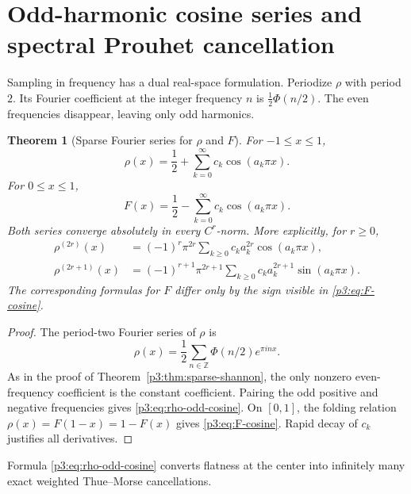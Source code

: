 \documentclass[11pt,oneside]{article}
\newtheorem{theorem}{Theorem}[section]
\theoremstyle{definition}
\begin{document}
\section{Odd-harmonic cosine series and spectral Prouhet cancellation}
\label{p3:sec:cosine-p-series}

Sampling in frequency has a dual real-space formulation.  Periodize \(\rho\) with period
\(2\).  Its Fourier coefficient at the integer frequency \(n\) is
\(\frac12\Phi(n/2)\).  The even frequencies disappear, leaving only odd harmonics.

\begin{theorem}[Sparse Fourier series for \(\rho\) and \(F\)]
\label{p3:thm:sparse-cosine}
For \(-1\le x\le1\),
\begin{equation}
\boxed{
 \rho(x)=\frac12+\sum_{k=0}^{\infty}c_k\cos(a_k\pi x).}    \label{p3:eq:rho-odd-cosine}
\end{equation}
For \(0\le x\le1\),
\begin{equation}
\boxed{
 F(x)=\frac12-\sum_{k=0}^{\infty}c_k\cos(a_k\pi x).}      \label{p3:eq:F-cosine}
\end{equation}
Both series converge absolutely in every \(C^r\)-norm.  More explicitly, for
\(r\ge0\),
\begin{align}
 \rho^{(2r)}(x)
 &=(-1)^r\pi^{2r}\sum_{k\ge0}c_ka_k^{2r}\cos(a_k\pi x),  \label{p3:eq:rho-even-der}\\
 \rho^{(2r+1)}(x)
 &=(-1)^{r+1}\pi^{2r+1}\sum_{k\ge0}c_ka_k^{2r+1}
    \sin(a_k\pi x).                                      \label{p3:eq:rho-odd-der}
\end{align}
The corresponding formulas for \(F\) differ only by the sign visible in
\eqref{p3:eq:F-cosine}.
\end{theorem}

\begin{proof}
The period-two Fourier series of \(\rho\) is
\[
 \rho(x)=\frac12\sum_{n\in\mathbb Z}\Phi(n/2)e^{\pi i n x}.
\]
As in the proof of Theorem~\ref{p3:thm:sparse-shannon}, the only nonzero even-frequency
coefficient is the constant coefficient.  Pairing the odd positive and negative
frequencies gives \eqref{p3:eq:rho-odd-cosine}.  On \([0,1]\), the folding relation
\(\rho(x)=F(1-x)=1-F(x)\) gives \eqref{p3:eq:F-cosine}.  Rapid decay of \(c_k\) justifies
all derivatives.
\end{proof}

Formula \eqref{p3:eq:rho-odd-cosine} converts flatness at the center into infinitely many exact
weighted Thue--Morse cancellations.
\end{document}
